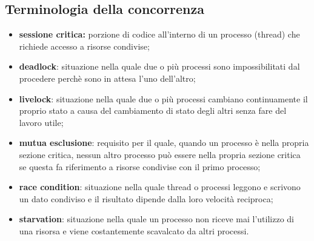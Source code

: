 \documentclass[12pt, letterpaper]{report}
\begin{document}
	\subsection{Terminologia della concorrenza}
	\begin{itemize}
		\item \textbf{sessione critica:} porzione di codice all'interno di un processo (thread) che richiede accesso a risorse condivise;
		\item \textbf{deadlock}: situazione nella quale due o più processi sono impossibilitati dal procedere perchè sono in attesa l'uno dell'altro;
		\item \textbf{livelock}: situazione nella quale due o più processi cambiano continuamente il proprio stato a causa del cambiamento di stato degli altri senza fare del lavoro utile;
		\item \textbf{mutua esclusione}: requisito per il quale, quando un processo è nella propria sezione critica, nessun altro processo può essere nella propria sezione critica se questa fa riferimento a risorse condivise con il primo processo;
		\item \textbf{race condition}: situazione nella quale thread o processi leggono e scrivono un dato condiviso e il risultato dipende dalla loro velocità reciproca;
		\item \textbf{starvation}: situazione nella quale un processo non riceve mai l'utilizzo di una risorsa e viene costantemente scavalcato da altri processi.
	\end{itemize}
\end{document}
